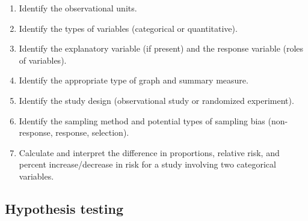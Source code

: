 \documentclass[
]{report}
\begin{document}
\begin{enumerate}
\def\labelenumi{\arabic{enumi}.}
\item
  Identify the observational units.
\item
  Identify the types of variables (categorical or quantitative).
\item
  Identify the explanatory variable (if present) and the response variable (roles of variables).
\item
  Identify the appropriate type of graph and summary measure.
\item
  Identify the study design (observational study or randomized experiment).
\item
  Identify the sampling method and potential types of sampling bias (non-response, response, selection).
\item
  Calculate and interpret the difference in proportions, relative risk, and percent increase/decrease in risk for a study involving two categorical variables.
\end{enumerate}

\subsection*{Hypothesis testing}\label{hypothesis-testing-4}
\end{document}
